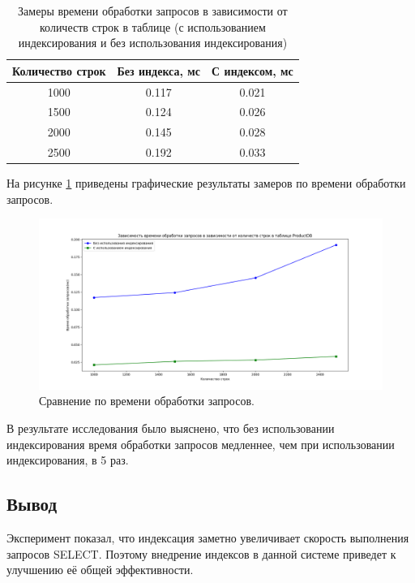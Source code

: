 \begin{table}[H]
	\begin{center}
		\caption{Замеры времени обработки запросов в зависимости от количеств строк в таблице (с использованием индексирования и без использования индексирования)}
		\begin{tabular}{|c|c|c|}
			\hline
			Количество строк & Без индекса, мс & С индексом, мс \\
			\hline
			1000 & 0.117 & 0.021 \\
			\hline
			1500 & 0.124&0.026\\
			\hline
			2000 & 0.145 & 0.028\\
			\hline
			2500 &0.192 & 0.033\\
			\hline 
		\end{tabular}
		\label{table:db:time}
	\end{center}
\end{table}
\newpage
На рисунке \ref{img:time} приведены графические результаты замеров по времени обработки запросов.
\begin{figure}[ht!]
	\centering
	\includegraphics[width=1.1\linewidth]{img/time.png}
	\caption{Сравнение по времени обработки запросов.}
	\label{img:time}
\end{figure}

В результате исследования было выяснено, что без использовании индексирования время обработки запросов медленнее, чем при использовании индексирования, в 5 раз.


\subsection*{Вывод}

Эксперимент показал, что индексация заметно увеличивает скорость выполнения запросов SELECT. Поэтому внедрение индексов в данной системе приведет к улучшению её общей эффективности.